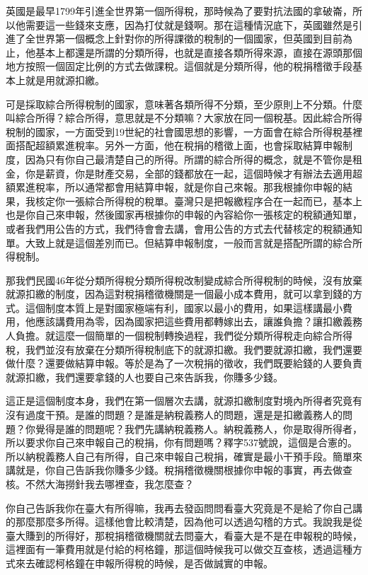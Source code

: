 \documentclass[oneside,sub3section]{ctexbook}
\begin{document}
英國是最早1799年引進全世界第一個所得稅，那時候為了要對抗法國的拿破崙，所以他需要這一些錢來支應，因為打仗就是錢啊。那在這種情況底下，英國雖然是引進了全世界第一個概念上針對你的所得課徵的稅制的一個國家，但英國到目前為止，他基本上都還是所謂的分類所得，也就是直接各類所得來源，直接在源頭那個地方按照一個固定比例的方式去做課稅。這個就是分類所得，他的稅捐稽徵手段基本上就是用就源扣繳。

可是採取綜合所得稅制的國家，意味著各類所得不分類，至少原則上不分類。什麼叫綜合所得？綜合所得，意思就是不分類嘛？大家放在同一個稅基。因此綜合所得稅制的國家，一方面受到19世紀的社會國思想的影響，一方面會在綜合所得稅基裡面搭配超額累進稅率。另外一方面，他在稅捐的稽徵上面，也會採取結算申報制度，因為只有你自己最清楚自己的所得。所謂的綜合所得的概念，就是不管你是租金，你是薪資，你是財產交易，全部的錢都放在一起，這個時候才有辦法去適用超額累進稅率，所以通常都會用結算申報，就是你自己來報。那我根據你申報的結果，我核定你一張綜合所得稅的稅單。臺灣只是把報繳程序合在一起而已，基本上也是你自己來申報，然後國家再根據你的申報的內容給你一張核定的稅額通知單，或者我們用公告的方式，我們待會會去講，會用公告的方式去代替核定的稅額通知單。大致上就是這個差別而已。但結算申報制度，一般而言就是搭配所謂的綜合所得稅制。

那我們民國46年從分類所得稅分類所得稅改制變成綜合所得稅制的時候，沒有放棄就源扣繳的制度，因為這對稅捐稽徵機關是一個最小成本費用，就可以拿到錢的方式。這個制度本質上是對國家極端有利，國家以最小的費用，如果這樣講最小費用，他應該講費用為零，因為國家把這些費用都轉嫁出去，讓誰負擔？讓扣繳義務人負擔。就這麼一個簡單的一個稅制轉換過程，我們從分類所得稅走向綜合所得稅，我們並沒有放棄在分類所得稅制底下的就源扣繳。我們要就源扣繳，我們還要做什麼？還要做結算申報。等於是為了一次稅捐的徵收，我們既要給錢的人要負責就源扣繳，我們還要拿錢的人也要自己來告訴我，你賺多少錢。

這正是這個制度本身，我們在第一個層次去講，就源扣繳制度對境內所得者究竟有沒有過度干預。是誰的問題？是誰是納稅義務人的問題，還是是扣繳義務人的問題？你覺得是誰的問題呢？我們先講納稅義務人。納稅義務人，你是取得所得者，所以要求你自己來申報自己的稅捐，你有問題嗎？釋字537號說，這個是合憲的。所以納稅義務人自己有所得，自己來申報自己稅捐，確實是最小干預手段。簡單來講就是，你自己告訴我你賺多少錢。稅捐稽徵機關根據你申報的事實，再去做查核。不然大海撈針我去哪裡查，我怎麼查？

你自己告訴我你在臺大有所得嘛，我再去發函問問看臺大究竟是不是給了你自己講的那麼那麼多所得。這樣他會比較清楚，因為他可以透過勾稽的方式。我說我是從臺大賺到的所得好，那稅捐稽徵機關就去問臺大，看臺大是不是在申報稅的時候，這裡面有一筆費用就是付給的柯格鐘，那這個時候我可以做交互查核，透過這種方式來去確認柯格鐘在申報所得稅的時候，是否做誠實的申報。
\end{document}
